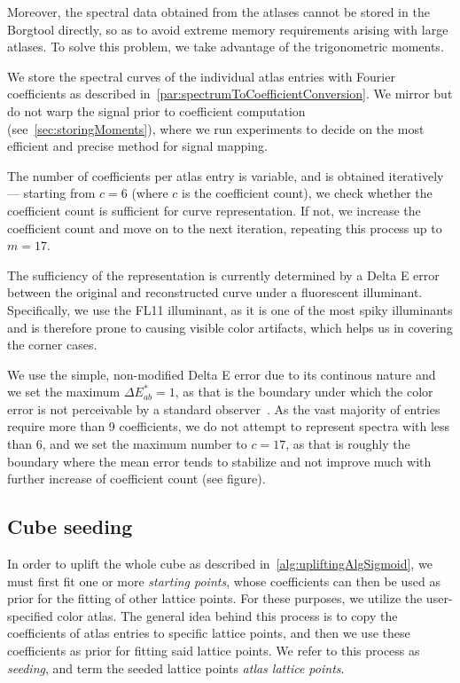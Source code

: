 Moreover, the spectral data obtained from the atlases cannot be stored in the Borgtool directly, so as to avoid extreme memory requirements arising with large atlases. To solve this problem, we take advantage of the trigonometric moments.

We store the spectral curves of the individual atlas entries with Fourier coefficients as described in~\cref{par:spectrumToCoefficientConversion}. We mirror but do not warp the signal prior to coefficient computation (see~\cref{sec:storingMoments}), where we run experiments to decide on the most efficient and precise method for signal mapping.

The number of coefficients per atlas entry is variable, and is obtained iteratively --- starting from $c=6$ (where $c$ is the coefficient count), we check whether the coefficient count is sufficient for curve representation. If not, we increase the coefficient count and move on to the next iteration, repeating this process up to $m=17$.

The sufficiency of the representation is currently determined by a Delta E error between the original and reconstructed curve under a fluorescent illuminant. Specifically, we use the FL11 illuminant, as it is one of the most spiky illuminants and is therefore prone to causing visible color artifacts, which helps us in covering the corner cases.

We use the simple, non-modified Delta E error due to its continous nature and we set the maximum $\Delta E_{ab}^* = 1$, as that is the boundary under which the color error is not perceivable by a standard observer~\cite{maximumDeltaE}. As the vast majority of entries require more than 9 coefficients, we do not attempt to represent spectra with less than 6, and we set the maximum number to $c=17$, as that is roughly the boundary where the mean error tends to stabilize and not improve much with further increase of coefficient count (see figure).

\subsection{Cube seeding}

In order to uplift the whole cube as described in~\cref{alg:upliftingAlgSigmoid}, we must first fit one or more \emph{starting points}, whose coefficients can then be used as prior for the fitting of other lattice points. For these purposes, we utilize the user-specified color atlas. The general idea behind this process is to copy the coefficients of atlas entries to specific lattice points, and then we use these coefficients as prior for fitting said lattice points. We refer to this process as \emph{seeding}, and term the seeded lattice points \emph{atlas lattice points}.

